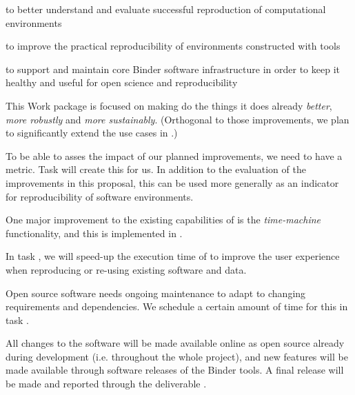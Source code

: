 
\begin{workpackage}[
  id=reproducibility,
  wphases={0-24!0.83,24-36!0.1},
  title=Improving robustness of reproducibility tools,
  short=Improving robustness,
  lead=QS,
  SRLRM=23,
  UIORM=0,
  MPRM=2,
  QSRM=12,
  swsites,
]
\begin{wpobjectives}
  \begin{compactitem}
    \item to better understand and evaluate successful reproduction of computational environments
    \item to improve the practical reproducibility of environments constructed
      with \TheProject tools
    \item to support and maintain core Binder software infrastructure in order to keep it healthy
         and useful for open science and reproducibility
 \end{compactitem}
\end{wpobjectives}

\begin{wpdescription}

This Work package is focused on making \repotodocker{} do the things it does
already \emph{better}, \emph{more robustly} and \emph{more sustainably}.
(Orthogonal to those improvements, we plan to significantly extend the
\repotodocker{} use cases in .)

To be able to asses the impact of our planned improvements, we need to have a
metric. Task  will create this
for us. In addition to the evaluation of the improvements in this proposal, this
can be used more generally as an indicator for reproducibility of software
environments.

One major improvement to the existing capabilities of \repotodocker is the
\emph{time-machine} functionality, and this is implemented in .

In task , we will speed-up the execution time of
\repotodocker{} to improve the user experience when reproducing or re-using
existing software and data.

Open source software needs ongoing maintenance to adapt to changing requirements
and dependencies. We schedule a certain amount of time for this in task
.

All changes to the software will be made available online as open source already during development
(i.e. throughout the whole project), and new features will be made available
through software releases of the Binder tools. A final release will be made and
reported through the deliverable .


\end{wpdescription}
\end{workpackage}
